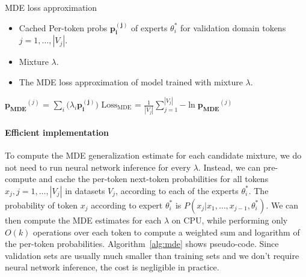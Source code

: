 \begin{algorithm}[]
   \caption{MDE loss approximation}
   \label{alg:mde}
\begin{algorithmic}
\footnotesize %

 \begin{itemize}
  \item Cached Per-token probs $\mathbf{p_i^{(j)}}$ of experts $\theta^{*}_i$ for validation domain tokens $j=1,\ldots,|V_j|$.
  \item Mixture $\lambda$.
\end{itemize}


 \begin{itemize}
\item The MDE loss approximation of model trained with mixture $\lambda$.
\end{itemize}

    \State \hspace{1em} $\mathbf{p_{\text{MDE}}}^{(j)}$ = $\sum_i (\lambda_i \mathbf{{p}_i^{(j)})}$
   \hspace{1em} \EndFor
    \State \hspace{1em} $\text{Loss}_{\text{MDE}}$ = $\frac{1}{|V_j|} \sum_{j=1}^{|V_j|}{ -\ln \mathbf{p_{\text{MDE}}}^{(j)}}$ 

\end{algorithmic}
\end{algorithm}

\paragraph{Efficient implementation} To compute the MDE generalization estimate for each candidate mixture, we do not need to run neural network inference for every $\lambda$. Instead, we can pre-compute and cache the per-token next-token probabilities for all tokens $x_j, j=1,\ldots, |V_j|$ in  datasets $V_j$, according to each of the experts $\theta^{*}_i$. The probability of token $x_j$ according to expert $\theta^{*}_i$ is $P(x_j|x_1,\ldots,x_{j-1},\theta^{*}_i)$.  We can then compute the MDE estimates for each $\lambda$  on CPU, while performing only $O(k)$ operations over each token to compute a weighted sum and logarithm of the per-token probabilities. Algorithm~\ref{alg:mde} shows pseudo-code. Since validation sets are usually much smaller than training sets and we don't require neural network inference, the cost is negligible in practice.



